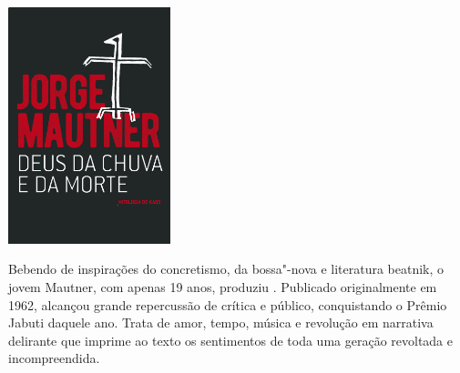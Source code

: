 \pagebreak

\hspace{.5cm}

\begin{center}
\hspace*{-4cm}
\hspace*{4cm}\includegraphics[width=47mm]{./imgs/mautner.jpg}
\end{center}

\hspace*{-7cm}\hrulefill\hspace*{-7cm}

\medskip

\noindent{}Bebendo de inspirações do concretismo, da bossa"-nova e literatura beatnik, o jovem Mautner, com apenas 19 anos, produziu {}. Publicado originalmente em 1962, alcançou grande repercussão de crítica e público, conquistando o Prêmio Jabuti daquele ano. Trata de amor, tempo, música e revolução em narrativa delirante que imprime ao texto os sentimentos de toda uma geração revoltada e incompreendida.

\vfill

\hspace*{-.4cm}\begin{minipage}[c]{1\linewidth}
\small{
{}}
\end{minipage}

